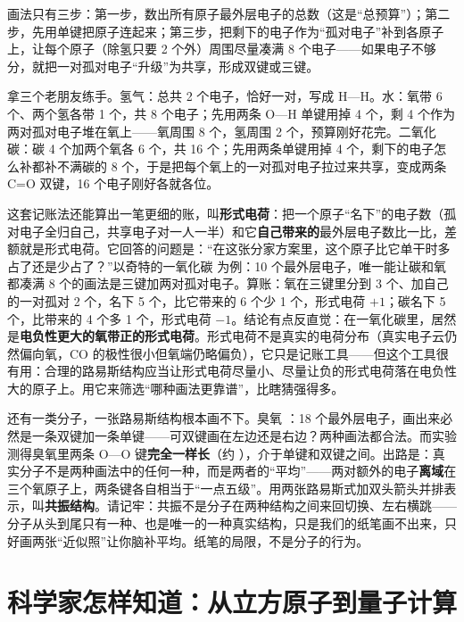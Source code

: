 画法只有三步：第一步，数出所有原子最外层电子的总数（这是“总预算”）；第二步，先用单键把原子连起来；第三步，把剩下的电子作为“孤对电子”补到各原子上，让每个原子（除氢只要 2 个外）周围尽量凑满 8 个电子——如果电子不够分，就把一对孤对电子“升级”为共享，形成双键或三键。

拿三个老朋友练手。氢气：总共 2 个电子，恰好一对，写成 H—H。水：氧带 6 个、两个氢各带 1 个，共 8 个电子；先用两条 O—H 单键用掉 4 个，剩 4 个作为两对孤对电子堆在氧上——氧周围 8 个，氢周围 2 个，预算刚好花完。二氧化碳：碳 4 个加两个氧各 6 个，共 16 个；先用两条单键用掉 4 个，剩下的电子怎么补都补不满碳的 8 个，于是把每个氧上的一对孤对电子拉过来共享，变成两条 C=O 双键，16 个电子刚好各就各位。

这套记账法还能算出一笔更细的账，叫\textbf{形式电荷}：把一个原子“名下”的电子数（孤对电子全归自己，共享电子对一人一半）和它\textbf{自己带来的}最外层电子数比一比，差额就是形式电荷。它回答的问题是：“在这张分家方案里，这个原子比它单干时多占了还是少占了？”以奇特的一氧化碳  为例：10 个最外层电子，唯一能让碳和氧都凑满 8 个的画法是三键加两对孤对电子。算账：氧在三键里分到 3 个、加自己的一对孤对 2 个，名下 5 个，比它带来的 6 个少 1 个，形式电荷 $+1$；碳名下 5 个，比带来的 4 个多 1 个，形式电荷 $-1$。结论有点反直觉：在一氧化碳里，居然是\textbf{电负性更大的氧带正的形式电荷}。形式电荷不是真实的电荷分布（真实电子云仍然偏向氧，CO 的极性很小但氧端仍略偏负），它只是记账工具——但这个工具很有用：合理的路易斯结构应当让形式电荷尽量小、尽量让负的形式电荷落在电负性大的原子上。用它来筛选“哪种画法更靠谱”，比瞎猜强得多。

还有一类分子，一张路易斯结构根本画不下。臭氧 ：18 个最外层电子，画出来必然是一条双键加一条单键——可双键画在左边还是右边？两种画法都合法。而实验测得臭氧里两条 O—O 键\textbf{完全一样长}（约 ），介于单键和双键之间。出路是：真实分子不是两种画法中的任何一种，而是两者的“平均”——两对额外的电子\textbf{离域}在三个氧原子上，两条键各自相当于“一点五级”。用两张路易斯式加双头箭头并排表示，叫\textbf{共振结构}。请记牢：共振不是分子在两种结构之间来回切换、左右横跳——分子从头到尾只有一种、也是唯一的一种真实结构，只是我们的纸笔画不出来，只好画两张“近似照”让你脑补平均。纸笔的局限，不是分子的行为。

\section{科学家怎样知道：从立方原子到量子计算}

